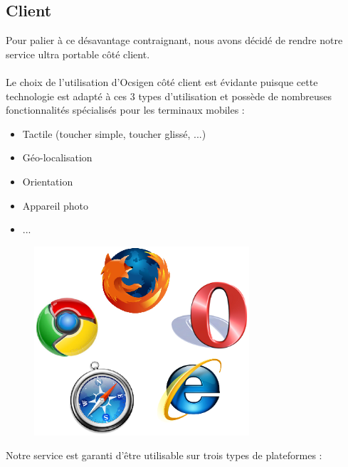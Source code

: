 \documentclass{life-fr}
\begin{document}
\subsection{Client}

Pour palier à ce désavantage contraignant, nous avons décidé de rendre notre
service ultra portable côté client.\\
\\
Le choix de l'utilisation d'Ocsigen côté client est évidante puisque cette
technologie est adapté à ces 3 types d'utilisation et possède de nombreuses
fonctionnalités spécialisés pour les terminaux mobiles :
\begin{itemize}
  \item Tactile (toucher simple, toucher glissé, ...)
  \item Géo-localisation
  \item Orientation
  \item Appareil photo
  \item ...
\end{itemize}

\begin{figure}[H]
  \begin{center}
    \includegraphics[width=8cm]{img/navigateurs.png}
  \end{center}
\end{figure}

Notre service est garanti d'être utilisable sur trois types de plateformes :
\end{document}
